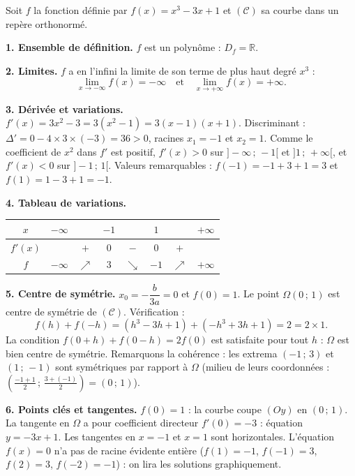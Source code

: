 \documentclass[11pt]{article}
\begin{document}
\begin{exemplebox}
Soit $f$ la fonction définie par $f(x) = x^3 - 3x + 1$ et $(\mathcal{C})$ sa courbe dans un repère orthonormé.

\textbf{1. Ensemble de définition.} $f$ est un polynôme : $D_f = \mathbb{R}$.

\textbf{2. Limites.} $f$ a en l'infini la limite de son terme de plus haut degré $x^3$ :
\[ \lim_{x \to -\infty} f(x) = -\infty \quad \text{et} \quad \lim_{x \to +\infty} f(x) = +\infty. \]

\textbf{3. Dérivée et variations.} $f'(x) = 3x^2 - 3 = 3(x^2 - 1) = 3(x-1)(x+1)$.
Discriminant : $\Delta' = 0 - 4 \times 3 \times (-3) = 36 > 0$, racines $x_1 = -1$ et $x_2 = 1$. Comme le coefficient de $x^2$ dans $f'$ est positif, $f'(x) > 0$ sur $]-\infty\,;\,-1[$ et $]1\,;\,+\infty[$, et $f'(x) < 0$ sur $]-1\,;\,1[$.
Valeurs remarquables : $f(-1) = -1 + 3 + 1 = 3$ et $f(1) = 1 - 3 + 1 = -1$.

\textbf{4. Tableau de variations.}
\begin{center}
\begin{tabular}{|c|ccccccc|}
\hline
$x$ & $-\infty$ & & $-1$ & & $1$ & & $+\infty$ \\
\hline
$f'(x)$ & & $+$ & $0$ & $-$ & $0$ & $+$ & \\
\hline
$f$ & $-\infty$ & $\nearrow$ & $3$ & $\searrow$ & $-1$ & $\nearrow$ & $+\infty$ \\
\hline
\end{tabular}
\end{center}

\textbf{5. Centre de symétrie.} $x_0 = -\dfrac{b}{3a} = 0$ et $f(0) = 1$. Le point $\Omega(0\,;\,1)$ est centre de symétrie de $(\mathcal{C})$. Vérification :
\[ f(h) + f(-h) = \left(h^3 - 3h + 1\right) + \left(-h^3 + 3h + 1\right) = 2 = 2 \times 1. \]
La condition $f(0 + h) + f(0 - h) = 2f(0)$ est satisfaite pour tout $h$ : $\Omega$ est bien centre de symétrie. Remarquons la cohérence : les extrema $(-1\,;\,3)$ et $(1\,;\,-1)$ sont symétriques par rapport à $\Omega$ (milieu de leurs coordonnées : $\left(\frac{-1+1}{2}\,;\,\frac{3+(-1)}{2}\right) = (0\,;\,1)$).

\textbf{6. Points clés et tangentes.} $f(0) = 1$ : la courbe coupe $(Oy)$ en $(0\,;\,1)$. La tangente en $\Omega$ a pour coefficient directeur $f'(0) = -3$ : équation $y = -3x + 1$. Les tangentes en $x = -1$ et $x = 1$ sont horizontales. L'équation $f(x) = 0$ n'a pas de racine évidente entière ($f(1) = -1$, $f(-1) = 3$, $f(2) = 3$, $f(-2) = -1$) : on lira les solutions graphiquement.
\end{exemplebox}
\end{document}
